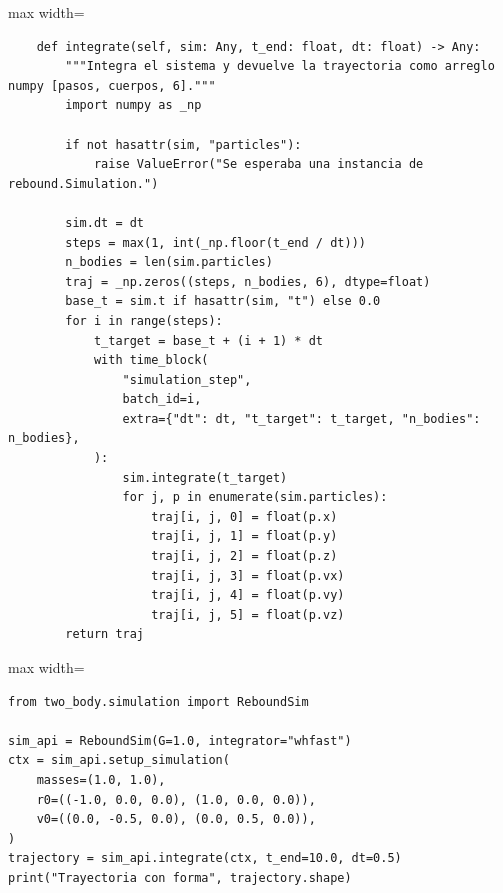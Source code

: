 \begin{listing}[H]
\caption{Bloque de código de \texttt{integrate}}
\begin{adjustbox}{max width=\textwidth}
\begin{minipage}{\textwidth}
\begin{verbatim}
    def integrate(self, sim: Any, t_end: float, dt: float) -> Any:
        """Integra el sistema y devuelve la trayectoria como arreglo numpy [pasos, cuerpos, 6]."""
        import numpy as _np

        if not hasattr(sim, "particles"):
            raise ValueError("Se esperaba una instancia de rebound.Simulation.")

        sim.dt = dt
        steps = max(1, int(_np.floor(t_end / dt)))
        n_bodies = len(sim.particles)
        traj = _np.zeros((steps, n_bodies, 6), dtype=float)
        base_t = sim.t if hasattr(sim, "t") else 0.0
        for i in range(steps):
            t_target = base_t + (i + 1) * dt
            with time_block(
                "simulation_step",
                batch_id=i,
                extra={"dt": dt, "t_target": t_target, "n_bodies": n_bodies},
            ):
                sim.integrate(t_target)
                for j, p in enumerate(sim.particles):
                    traj[i, j, 0] = float(p.x)
                    traj[i, j, 1] = float(p.y)
                    traj[i, j, 2] = float(p.z)
                    traj[i, j, 3] = float(p.vx)
                    traj[i, j, 4] = float(p.vy)
                    traj[i, j, 5] = float(p.vz)
        return traj
\end{verbatim}
\end{minipage}
\end{adjustbox}
\end{listing}
\vspace{0.2cm}

\begin{listing}[H]
\caption{Ejemplo de uso de \texttt{ReboundSim}}
\begin{adjustbox}{max width=\textwidth}
\begin{minipage}{\textwidth}
\begin{verbatim}
from two_body.simulation import ReboundSim

sim_api = ReboundSim(G=1.0, integrator="whfast")
ctx = sim_api.setup_simulation(
    masses=(1.0, 1.0),
    r0=((-1.0, 0.0, 0.0), (1.0, 0.0, 0.0)),
    v0=((0.0, -0.5, 0.0), (0.0, 0.5, 0.0)),
)
trajectory = sim_api.integrate(ctx, t_end=10.0, dt=0.5)
print("Trayectoria con forma", trajectory.shape)
\end{verbatim}
\end{minipage}
\end{adjustbox}
\end{listing}
\vspace{0.2cm}

